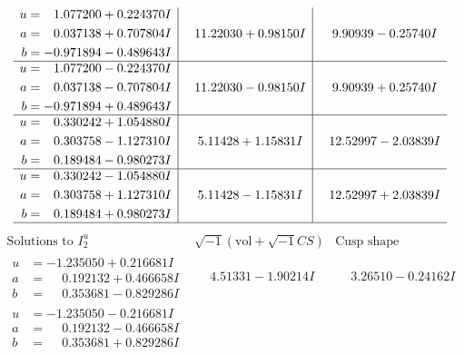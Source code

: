\documentclass[1p]{elsarticle_modified}
\theoremstyle{definition}
\newcommand{\I}{\sqrt{-1}}
\begin{document}
$$\begin{array}{c|c|c}
\begin{aligned}
u &= \phantom{-}1.077200 + 0.224370 I \\
a &= \phantom{-}0.037138 + 0.707804 I \\
b &= -0.971894 - 0.489643 I\end{aligned}
 & \phantom{-}11.22030 + 0.98150 I & \phantom{-}9.90939 - 0.25740 I \\ \hline\begin{aligned}
u &= \phantom{-}1.077200 - 0.224370 I \\
a &= \phantom{-}0.037138 - 0.707804 I \\
b &= -0.971894 + 0.489643 I\end{aligned}
 & \phantom{-}11.22030 - 0.98150 I & \phantom{-}9.90939 + 0.25740 I \\ \hline\begin{aligned}
u &= \phantom{-}0.330242 + 1.054880 I \\
a &= \phantom{-}0.303758 - 1.127310 I \\
b &= \phantom{-}0.189484 - 0.980273 I\end{aligned}
 & \phantom{-}5.11428 + 1.15831 I & \phantom{-}12.52997 - 2.03839 I \\ \hline\begin{aligned}
u &= \phantom{-}0.330242 - 1.054880 I \\
a &= \phantom{-}0.303758 + 1.127310 I \\
b &= \phantom{-}0.189484 + 0.980273 I\end{aligned}
 & \phantom{-}5.11428 - 1.15831 I & \phantom{-}12.52997 + 2.03839 I\\
 \hline 
 \end{array}$$\newpage$$\begin{array}{c|c|c}  
\text{Solutions to }I^u_{2}& \I (\text{vol} + \sqrt{-1}CS) & \text{Cusp shape}\\
 \hline 
\begin{aligned}
u &= -1.235050 + 0.216681 I \\
a &= \phantom{-}0.192132 + 0.466658 I \\
b &= \phantom{-}0.353681 - 0.829286 I\end{aligned}
 & \phantom{-}4.51331 - 1.90214 I & \phantom{-}3.26510 - 0.24162 I \\ \hline\begin{aligned}
u &= -1.235050 - 0.216681 I \\
a &= \phantom{-}0.192132 - 0.466658 I \\
b &= \phantom{-}0.353681 + 0.829286 I\end{aligned}

\end{array}$$
\end{document}
